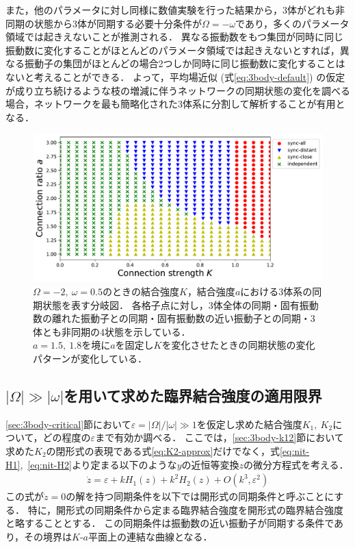 \documentclass[../main]{subfiles}
\begin{document}
また，他のパラメータに対し同様に数値実験を行った結果から，3体がどれも非同期の状態から3体が同期する必要十分条件が$\Omega=-\omega$であり，多くのパラメータ領域では起きえないことが推測される．
異なる振動数をもつ集団が同時に同じ振動数に変化することがほとんどのパラメータ領域では起きえないとすれば，異なる振動子の集団がほとんどの場合2つしか同時に同じ振動数に変化することはないと考えることができる．
よって，平均場近似 (式\eqref{eq:3body-default}) の仮定が成り立ち続けるような枝の増減に伴うネットワークの同期状態の変化を調べる場合，ネットワークを最も簡略化された3体系に分割して解析することが有用となる．
\begin{figure}[tbp]
\centering
\includegraphics[width=135mm]{./images/three-body-phase-boundary.pdf}
\centering
\caption{$\Omega=-2,\ \omega=0.5$のときの結合強度$K$，結合強度$a$における3体系の同期状態を表す分岐図．
各格子点に対し，3体全体の同期・固有振動数の離れた振動子との同期・固有振動数の近い振動子との同期・3体とも非同期の4状態を示している．\\
$a=1.5,\ 1.8$を境に$a$を固定し$K$を変化させたときの同期状態の変化パターンが変化している．}
\label{fig:3body-phase-boundary}
\end{figure}

\subsection{$|\Omega|\gg|\omega|$を用いて求めた臨界結合強度の適用限界}
\ref{sec:3body-critical}節において$\varepsilon=|\Omega|/|\omega|\gg 1$を仮定し求めた結合強度$K_1,\ K_2$について，どの程度の$\varepsilon$まで有効か調べる．
ここでは，\ref{sec:3body-k12}節において求めた$K_2$の閉形式の表現である式\eqref{eq:K2-approx}だけでなく，式\eqref{eq:nit-H1},\ \eqref{eq:nit-H2}より定まる以下のような$y$の近恒等変換$z$の微分方程式を考える．
\begin{align}
    \label{eq:k1k2-open}
    \dot{z}=\varepsilon+kH_1(z)+k^2H_2(z)+O(k^3,\varepsilon^2)
\end{align}
この式が$\dot{z}=0$の解を持つ同期条件を以下では開形式の同期条件と呼ぶことにする．
特に，開形式の同期条件から定まる臨界結合強度を開形式の臨界結合強度と略することとする．
この同期条件は振動数の近い振動子が同期する条件であり，その境界は$K$-$a$平面上の連結な曲線となる．
\end{document}
